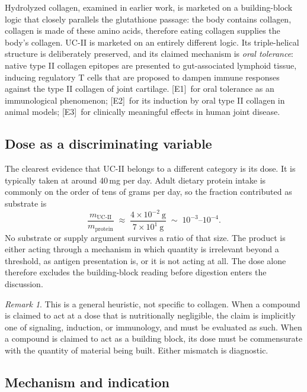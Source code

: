 \documentclass[11pt,a4paper]{article}
\theoremstyle{plain}
\theoremstyle{definition}
\theoremstyle{remark}
\newtheorem{remark}{Remark}
\newcommand{\tier}[1]{\textup{\textsc{[#1]}}}
\newcommand{\Eone}{\tier{E1}}
\newcommand{\Etwo}{\tier{E2}}
\newcommand{\Ethree}{\tier{E3}}
\begin{document}
Hydrolyzed collagen, examined in earlier work, is marketed on a building-block logic that closely parallels the glutathione passage: the body contains collagen, collagen is made of these amino acids, therefore eating collagen supplies the body's collagen. UC-II is marketed on an entirely different logic. Its triple-helical structure is deliberately preserved, and its claimed mechanism is \emph{oral tolerance}: native type II collagen epitopes are presented to gut-associated lymphoid tissue, inducing regulatory T cells that are proposed to dampen immune responses against the type II collagen of joint cartilage. \Eone\ for oral tolerance as an immunological phenomenon; \Etwo\ for its induction by oral type II collagen in animal models; \Ethree\ for clinically meaningful effects in human joint disease.

\subsection{Dose as a discriminating variable}

The clearest evidence that UC-II belongs to a different category is its dose. It is typically taken at around 40\,mg per day. Adult dietary protein intake is commonly on the order of tens of grams per day, so the fraction contributed as substrate is
\[
\frac{m_{\text{UC-II}}}{m_{\text{protein}}} \;\approx\; \frac{4\times 10^{-2}\ \text{g}}{7\times 10^{1}\ \text{g}} \;\sim\; 10^{-3}\text{--}10^{-4}.
\]
No substrate or supply argument survives a ratio of that size. The product is either acting through a mechanism in which quantity is irrelevant beyond a threshold, as antigen presentation is, or it is not acting at all. The dose alone therefore excludes the building-block reading before digestion enters the discussion.

\begin{remark}
This is a general heuristic, not specific to collagen. When a compound is claimed to act at a dose that is nutritionally negligible, the claim is implicitly one of signaling, induction, or immunology, and must be evaluated as such. When a compound is claimed to act as a building block, its dose must be commensurate with the quantity of material being built. Either mismatch is diagnostic.
\end{remark}

\subsection{Mechanism and indication}
\end{document}
